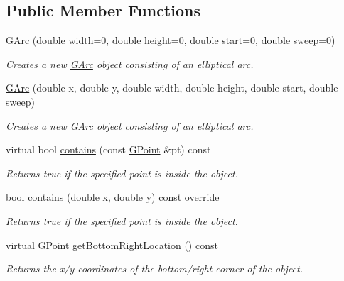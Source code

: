 \subsection*{Public Member Functions}
\begin{DoxyCompactItemize}
\item 
\mbox{\hyperlink{classsgl_1_1GArc_a487e2cfaa2231c74bb71eb4ba5bc0167}{G\+Arc}} (double width=0, double height=0, double start=0, double sweep=0)
\begin{DoxyCompactList}\small\item\em Creates a new {\ttfamily \mbox{\hyperlink{classsgl_1_1GArc}{G\+Arc}}} object consisting of an elliptical arc. \end{DoxyCompactList}\item 
\mbox{\hyperlink{classsgl_1_1GArc_ab70a642a06382d436427bd2f9519539a}{G\+Arc}} (double x, double y, double width, double height, double start, double sweep)
\begin{DoxyCompactList}\small\item\em Creates a new {\ttfamily \mbox{\hyperlink{classsgl_1_1GArc}{G\+Arc}}} object consisting of an elliptical arc. \end{DoxyCompactList}\item 
virtual bool \mbox{\hyperlink{classsgl_1_1GObject_a1dbc9dafaae51958112dbe1267a1f547}{contains}} (const \mbox{\hyperlink{structsgl_1_1GPoint}{G\+Point}} \&pt) const
\begin{DoxyCompactList}\small\item\em Returns {\ttfamily true} if the specified point is inside the object. \end{DoxyCompactList}\item 
bool \mbox{\hyperlink{classsgl_1_1GArc_ad973a1d55799d3a73bf8b04986cd804e}{contains}} (double x, double y) const override
\begin{DoxyCompactList}\small\item\em Returns {\ttfamily true} if the specified point is inside the object. \end{DoxyCompactList}\item 
virtual \mbox{\hyperlink{structsgl_1_1GPoint}{G\+Point}} \mbox{\hyperlink{classsgl_1_1GObject_a0d41183bf6b08de66fe3907551aab0d7}{get\+Bottom\+Right\+Location}} () const
\begin{DoxyCompactList}\small\item\em Returns the x/y coordinates of the bottom/right corner of the object. \end{DoxyCompactList}\item 

\end{DoxyCompactItemize}
